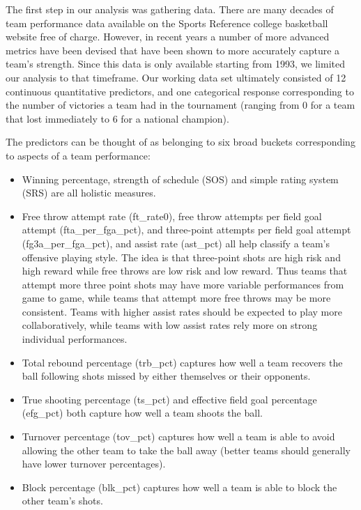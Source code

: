 \documentclass[10pt,a4paper, hidelinks]{article} %
\begin{document}
The first step in our analysis was gathering data. There are many decades of team performance data available on the Sports Reference college basketball website free of charge. However, in recent years a number of more advanced metrics have been devised that have been shown to more accurately capture a team's strength. Since this data is only available starting from 1993, we limited our analysis to that timeframe. Our working data set ultimately consisted of 12 continuous quantitative predictors, and one categorical response corresponding to the number of victories a team had in the tournament (ranging from 0 for a team that lost immediately to 6 for a national champion).

The predictors can be thought of as belonging to six broad buckets corresponding to aspects of a team performance:

\begin{itemize}
	\item Winning percentage, strength of schedule (SOS) and simple rating system (SRS) are all holistic measures.
	\item Free throw attempt rate (ft\_rate0), free throw attempts per field goal attempt (fta\_per\_fga\_pct), and three-point attempts per field goal attempt (fg3a\_per\_fga\_pct), and assist rate (ast\_pct) all help classify a team's offensive playing style. The idea is that three-point shots are high risk and high reward while free throws are low risk and low reward. Thus teams that attempt more three point shots may have more variable performances from game to game, while teams that attempt more free throws may be more consistent. Teams with higher assist rates should be expected to play more collaboratively, while teams with low assist rates rely more on strong individual performances.
	\item Total rebound percentage (trb\_pct) captures how well a team recovers the ball following shots missed by either themselves or their opponents.
	\item True shooting percentage (ts\_pct) and effective field goal percentage (efg\_pct) both capture how well a team shoots the ball.
	\item Turnover percentage (tov\_pct) captures how well a team is able to avoid allowing the other team to take the ball away (better teams should generally have lower turnover percentages).
	\item Block percentage (blk\_pct)  captures how well a team is able to block the other team's shots.
\end{itemize}
\end{document}
